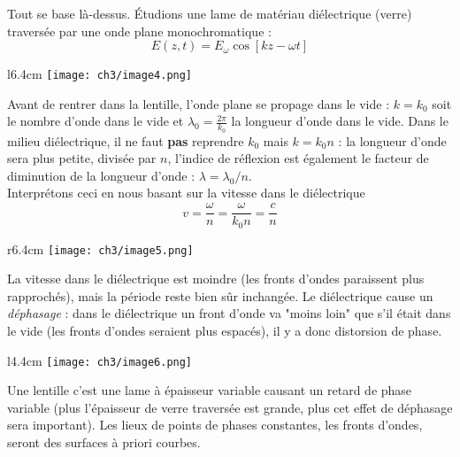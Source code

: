 Tout se base là-dessus. Étudions une lame de matériau diélectrique (verre) traversée par une onde 
plane monochromatique :
\begin{equation}
E(z,t) = E_\omega \cos[kz-\omega t]
\end{equation}
\newpage
\begin{wrapfigure}[8]{l}{6.4cm}
	\texttt{[image: ch3/image4.png]}
	\end{wrapfigure}
Avant de rentrer dans la lentille, l'onde plane se propage dans le vide : $k= k_0$ soit le 
nombre d'onde dans le vide et $\lambda_0 = \frac{2\pi}{k_0}$ la longueur d'onde dans le vide. Dans 
le milieu diélectrique, il ne faut \textbf{pas} reprendre $k_0$ mais $k = k_0n$ : la longueur 
d'onde sera plus petite, divisée par $n$, l'indice de réflexion est également le facteur de diminution 
de la longueur d'onde : $\lambda = \lambda_0/n$. \\

Interprétons ceci en nous basant sur la vitesse dans le diélectrique 
\begin{equation}
v = \frac{\omega}{n} = \frac{\omega}{k_0n} = \frac{c}{n}
\end{equation}

\begin{wrapfigure}[8]{r}{6.4cm}
	\vspace{-10mm}
	\texttt{[image: ch3/image5.png]}
	\end{wrapfigure}
La vitesse dans le diélectrique est moindre (les fronts d'ondes paraissent plus rapprochés), mais la 
période reste bien sûr inchangée. Le 
diélectrique cause un \textit{déphasage} : dans le diélectrique un front d'onde va "moins loin" que 
s'il était dans le vide (les fronts d'ondes seraient plus espacés), il y a donc distorsion de phase.\\


\begin{wrapfigure}[6]{l}{4.4cm}
	\vspace{-5mm}
	\texttt{[image: ch3/image6.png]}
	\end{wrapfigure}
Une lentille c'est une lame à épaisseur variable causant un retard de phase variable (plus l'épaisseur 
de verre traversée est grande, plus cet effet de déphasage sera important). Les lieux de points de phases 
constantes, les fronts d'ondes, seront des surfaces à priori courbes.\\

